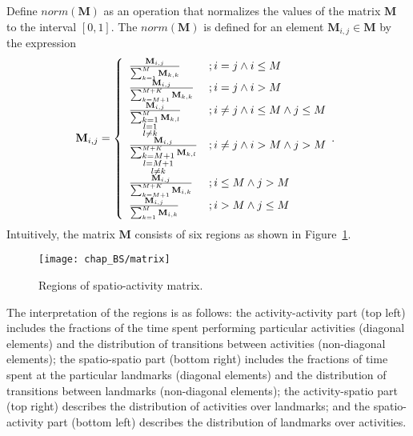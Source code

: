 Define $norm(\mathbf{M})$ as an operation that normalizes the values of the matrix $\mathbf{M}$ to the interval $[0, 1]$. The $norm(\mathbf{M})$ is defined for an element $\mathbf{M}_{i,j} \in \mathbf{M}$ by the expression
%
\begin{equation}
\mathbf{M}_{i, j} =  \left\{
\begin{array}{l l}

 \frac{\mathbf{M}_{i,j}}{\sum_{k=1}^{M} \mathbf{M}_{k,k}} & ; i = j \wedge i \leq M  \\

 \frac{\mathbf{M}_{i,j}}{\sum_{k=M+1}^{M+K} \mathbf{M}_{k,k}} & ; i = j \wedge i > M  \\

 \frac{\mathbf{M}_{i,j}}{\sum_{\substack{k=1\\l=1\\l\not = k}}^{M} \mathbf{M}_{k,l}} & ; i \neq j \wedge i \leq M \wedge j \leq M  \\

 \frac{\mathbf{M}_{i,j}}{\sum_{\substack{k=M+1\\l=M+1\\l\not = k}}^{M+K} \mathbf{M}_{k,l}} & ; i \neq j \wedge i > M \wedge j > M  \\

 \frac{\mathbf{M}_{i,j}}{\sum_{k=M+1}^{M+K} \mathbf{M}_{i,k}} & ; i \leq M \wedge j > M  \\

 \frac{\mathbf{M}_{i,j}}{\sum_{k=1}^{M} \mathbf{M}_{i,k}} & ; i > M \wedge j \leq M  \\

\end{array}. \right. \
\label{eq:normalize}
\end{equation}
%
Intuitively, the matrix $\mathbf{M}$ consists of six regions as shown in Figure~\ref{fig:matrix-regions}.
\begin{figure}[!ht]
\centering
\texttt{[image: chap\_BS/matrix]}
\caption{Regions of spatio-activity matrix.}
\label{fig:matrix-regions}
\end{figure}
The interpretation of the regions is as follows: the activity-activity part (top left) includes the fractions of the time spent performing particular activities (diagonal elements) and the distribution of transitions between activities (non-diagonal elements); the spatio-spatio part (bottom right) includes the fractions of time spent at the particular landmarks (diagonal elements) and the distribution of transitions  between landmarks (non-diagonal elements); the activity-spatio part (top right) describes the distribution of activities over landmarks; and the spatio-activity part (bottom left) describes the distribution of landmarks over activities.

